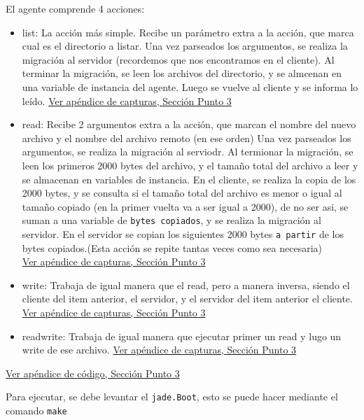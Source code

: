 \documentclass[12pt,journal,compsoc]{IEEEtran}
\begin{document}
El agente comprende 4 acciones:
\begin{itemize}
  \item list: La acción más simple. Recibe un parámetro extra a la acción,
        que marca cual es el directorio a listar.
        Una vez parseados los argumentos, se realiza la migración al servidor
        (recordemos que nos encontramos en el cliente).
        Al terminar la migración, se leen los archivos del directorio, y se
        almcenan en una variable de instancia del agente. Luego se vuelve al
        cliente y se informa lo leído.
        \hyperref[fig:list]{Ver apéndice de capturas, Sección Punto 3}

  \item read: Recibe 2 argumentos extra a la acción, que marcan el nombre del
        nuevo archivo y el nombre del archivo remoto (en ese orden)
        Una vez parseados los argumentos, se realiza la migración al serviodr.
        Al termionar la migración, se leen los primeros 2000 bytes del archivo,
        y el tamaño total del archivo a leer y se almacenan en variables de instancia.
        En el cliente, se realiza la copia de los 2000 bytes, y se consulta si el
        tamaño total del archivo es menor o igual al tamaño copiado (en la primer
        vuelta va a ser igual a 2000), de no ser asi, se suman a una variable de
        \texttt{bytes copiados}, y se realiza la migración al servidor.
        En el servidor se copian los siguientes 2000 bytes \texttt{a partir}
        de los bytes copiados.(Esta acción se repite tantas veces como 
        sea necesaria)\\
        \hyperref[fig:initial-file]{Ver apéndice de capturas, Sección Punto 3}
  
  \item write: Trabaja de igual manera que el read, pero a manera inversa,
        siendo el cliente del item anterior, el servidor, y el servidor del item
        anterior el cliente.
        \hyperref[fig:initial-file]{Ver apéndice de capturas, Sección Punto 3}
  \item readwrite: Trabaja de igual manera que ejecutar primer un read y lugo un
        write de ese archivo.
        \hyperref[fig:start-read2]{Ver apéndice de capturas, Sección Punto 3}
\end{itemize}

\hyperref[section:code-punto3]{Ver apéndice de código, Sección Punto 3}

Para ejecutar, se debe levantar el \texttt{jade.Boot}, esto se puede hacer
mediante el comando \texttt{make}
\end{document}
